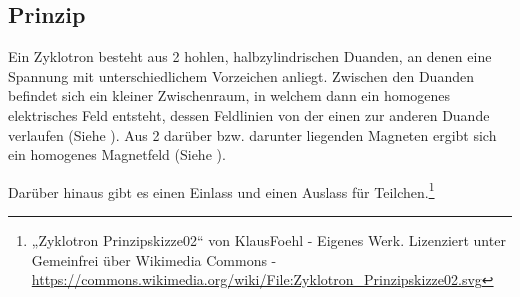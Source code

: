 




%
%	





\subsection{Prinzip} 

Ein Zyklotron besteht aus 2 hohlen, halbzylindrischen Duanden, an denen eine Spannung mit unterschiedlichem Vorzeichen anliegt. Zwischen den Duanden befindet sich ein kleiner Zwischenraum, in welchem dann ein homogenes elektrisches Feld entsteht, dessen Feldlinien von der einen zur anderen Duande verlaufen (Siehe ). Aus 2 darüber bzw. darunter liegenden Magneten ergibt sich ein homogenes Magnetfeld (Siehe ).

Darüber hinaus gibt es einen Einlass und einen Auslass für Teilchen.\footnote{„Zyklotron Prinzipskizze02“ von KlausFoehl - Eigenes Werk. Lizenziert unter Gemeinfrei über Wikimedia Commons - \url{https://commons.wikimedia.org/wiki/File:Zyklotron_Prinzipskizze02.svg}}


